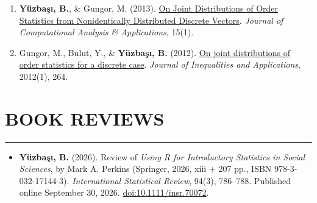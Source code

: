 \documentclass[10pt,letterpaper]{article}
\newcommand{\NewPart}[2]{%
	\Needspace{7\baselineskip}%
	\vspace{0.45em}%
	\section*{\sffamily\large\bfseries\color{MidnightBlue}\uppercase{#1} #2}%
	\vspace{-0.7em}\noindent\color{MidnightBlue}\rule{\textwidth}{0.55pt}\color{Black}\vspace{0.25em}}
\newcommand{\ArxivEntry}[3]{
		\noindent #1, ``\href{http://arxiv.org/abs/#3}{#2}'', \textit{{cond-mat/}#3}.}
\newenvironment{etaremune}{\begin{enumerate}}{\end{enumerate}}
\newcommand{\JournalInfo}[2]{\hspace{0.3em}{\small\textsf{[#1; #2]}}}
\begin{document}
\begin{etaremune}
\item {\bf Y\"{u}zba\c{s}{\i}, B.}, \& Gungor, M. (2013). 
\href{http://www.eudoxuspress.com/244/JOCAAA-VOL-15-2013.pdf}
{On Joint Distributions of Order Statistics from Nonidentically Distributed Discrete Vectors}. 
\emph{Journal of Computational Analysis \& Applications}, 15(1). \JournalInfo{SCIE}{Q4}
\label{by2013}

\item Gungor, M., Bulut, Y., \& {\bf Y\"{u}zba\c{s}{\i}, B.} (2012). 
\href{https://link.springer.com/article/10.1186/1029-242X-2012-264}
{On joint distributions of order statistics for a discrete case}. 
\emph{Journal of Inequalities and Applications}, 2012(1), 264. \JournalInfo{SCIE}{Q1; WoS/JCR 2025}





\end{etaremune}








\NewPart{Book Reviews}{}
\begin{itemize}
\item {\bf Y\"{u}zba\c{s}{\i}, B.} (2026). Review of \textit{Using R for Introductory Statistics in Social Sciences}, by Mark A. Perkins (Springer, 2026, xiii + 207 pp., ISBN 978-3-032-17144-3). \textit{International Statistical Review}, 94(3), 786--788. Published online September 30, 2026. \href{https://doi.org/10.1111/insr.70072}{doi:10.1111/insr.70072}. \JournalInfo{SCIE}{Q1}
\end{itemize}
\end{document}
